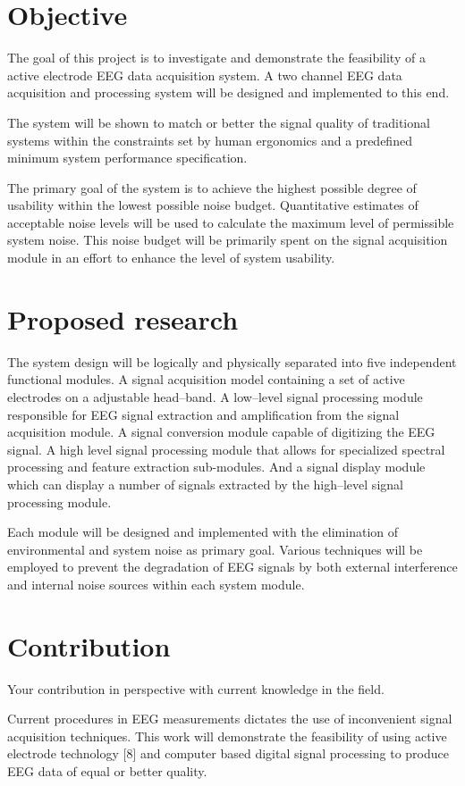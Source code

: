 \documentclass{article}
\begin{document}
\section{Objective}
The goal of this project is to investigate and demonstrate the
feasibility of a active electrode EEG data acquisition system. A two
channel EEG data acquisition and processing system will be designed
and implemented to this end.

The system will be shown to match or better the signal quality of
traditional systems within the constraints set by human ergonomics and
a predefined minimum system performance specification. 

The primary goal of the system is to achieve the highest possible
degree of usability within the lowest possible noise
budget. Quantitative estimates of acceptable noise levels will be used
to calculate the maximum level of permissible system noise. This noise
budget will be primarily spent on the signal acquisition module in an
effort to enhance the level of system usability.


\section{Proposed research}
The system design will be logically and physically separated into five
independent functional modules. A signal acquisition model containing
a set of active electrodes on a adjustable head--band. A low--level
signal processing module responsible for EEG signal extraction and
amplification from the signal acquisition module. A signal conversion
module capable of digitizing the EEG signal. A high level signal
processing module that allows for specialized spectral processing and
feature extraction sub-modules. And a signal display module which can
display a number of signals extracted by the high--level signal
processing module.

Each module will be designed and implemented with the elimination of
environmental and system noise as primary goal. Various techniques
will be employed to prevent the degradation of EEG signals by both
external interference and internal noise sources within each system
module.


\section{Contribution}
Your contribution in perspective with current knowledge in the field. 

Current procedures in EEG measurements dictates the use of
inconvenient signal acquisition techniques. This work will demonstrate
the feasibility of using active electrode technology [8] and computer
based digital signal processing to produce EEG data of equal or better
quality.
\end{document}
